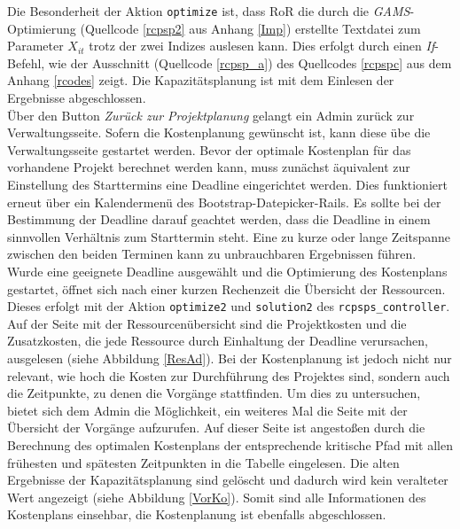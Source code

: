 \documentclass[a4paper,12pt,parskip,bibtotoc,liststotoc]{article}
\begin{document}
Die Besonderheit der Aktion \texttt{optimize} ist, dass RoR die durch die \textit{GAMS}-Optimierung (Quellcode \ref{rcpsp2} aus Anhang \ref{Imp}) erstellte Textdatei zum Parameter $X_{it}$ trotz der zwei Indizes auslesen kann. Dies erfolgt durch einen \textit{If}-Befehl, wie der Ausschnitt (Quellcode \ref{rcpsp_a}) des Quellcodes \ref{rcpspc} aus dem Anhang \ref{rcodes} zeigt. Die Kapazitätsplanung ist mit dem Einlesen der Ergebnisse abgeschlossen.\\



Über den Button \textit{Zurück zur Projektplanung} gelangt ein Admin zurück zur Verwaltungsseite. Sofern die Kostenplanung gewünscht ist, kann diese übe die Verwaltungsseite gestartet werden. Bevor der optimale Kostenplan für das vorhandene Projekt berechnet werden kann, muss zunächst äquivalent zur Einstellung des Starttermins eine Deadline eingerichtet werden. Dies funktioniert erneut über ein Kalendermenü des \glqq Bootstrap-Datepicker-Rails\grqq. Es sollte bei der Bestimmung der Deadline darauf geachtet werden, dass die Deadline in einem sinnvollen Verhältnis zum Starttermin steht. Eine zu kurze oder lange Zeitspanne zwischen den beiden Terminen kann zu unbrauchbaren Ergebnissen führen. Wurde eine geeignete Deadline ausgewählt und die Optimierung des Kostenplans gestartet, öffnet sich nach einer kurzen Rechenzeit die Übersicht der Ressourcen. Dieses erfolgt mit der Aktion \texttt{optimize2} und \texttt{solution2} des \texttt{rcpsps\_controller}.\\ 

Auf der Seite mit der Ressourcenübersicht sind die Projektkosten und die Zusatzkosten, die jede Ressource durch Einhaltung der Deadline verursachen, ausgelesen (siehe Abbildung \ref{ResAd}). Bei der Kostenplanung ist jedoch nicht nur relevant, wie hoch die Kosten zur Durchführung des Projektes sind, sondern auch die Zeitpunkte, zu denen die Vorgänge stattfinden. Um dies zu untersuchen, bietet sich dem Admin die Möglichkeit, ein weiteres Mal die Seite mit der Übersicht der Vorgänge aufzurufen. Auf dieser Seite ist angestoßen durch die Berechnung des optimalen Kostenplans der entsprechende kritische Pfad mit allen frühesten und spätesten Zeitpunkten in die Tabelle eingelesen. Die alten Ergebnisse der Kapazitätsplanung sind gelöscht und dadurch wird kein veralteter Wert angezeigt (siehe Abbildung \ref{VorKo}). Somit sind alle Informationen des Kostenplans einsehbar, die Kostenplanung ist ebenfalls abgeschlossen.\\  
\end{document}
